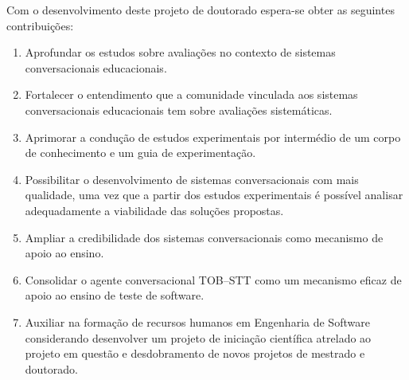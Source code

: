 Com o desenvolvimento deste projeto de doutorado espera-se obter as seguintes contribuições:

\begin{enumerate}

\item Aprofundar os estudos sobre avaliações no contexto de sistemas conversacionais educacionais.

\item Fortalecer o entendimento que a comunidade vinculada aos sistemas conversacionais educacionais tem sobre avaliações sistemáticas.

\item Aprimorar a condução de estudos experimentais por intermédio de um corpo de conhecimento e um guia de experimentação.

\item Possibilitar o desenvolvimento de sistemas conversacionais com mais qualidade, uma vez que a partir dos estudos experimentais é possível analisar adequadamente a viabilidade das soluções propostas.

\item Ampliar a credibilidade dos sistemas conversacionais como mecanismo de apoio ao ensino.

\item Consolidar o agente conversacional TOB--STT como um mecanismo eficaz de apoio ao ensino de teste de software.

\item Auxiliar na formação de recursos humanos em Engenharia de Software considerando desenvolver um projeto de iniciação científica atrelado ao projeto em questão e desdobramento de novos projetos de mestrado e doutorado.

\end{enumerate}


